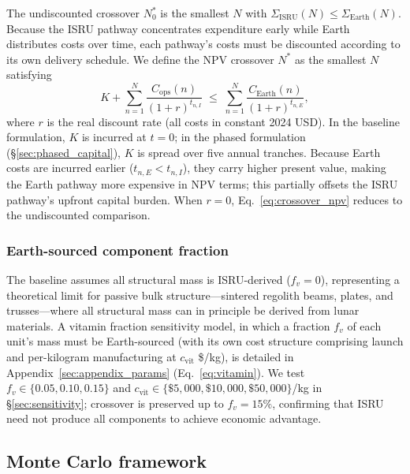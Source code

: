 \documentclass[preprint,12pt]{elsarticle}
\begin{document}
The undiscounted crossover $N^*_0$ is the smallest $N$ with $\Sigma_{\mathrm{ISRU}}(N) \leq \Sigma_{\mathrm{Earth}}(N)$. Because the ISRU pathway concentrates expenditure early while Earth distributes costs over time, each pathway's costs must be discounted according to its own delivery schedule. We define the NPV crossover $N^*$ as the smallest $N$ satisfying
\begin{equation}
  K + \sum_{n=1}^{N} \frac{C_{\mathrm{ops}}(n)}{(1+r)^{t_{n,I}}} \;\leq\; \sum_{n=1}^{N} \frac{C_{\mathrm{Earth}}(n)}{(1+r)^{t_{n,E}}},
  \label{eq:crossover_npv}
\end{equation}
where $r$ is the real discount rate (all costs in constant 2024 USD). In the baseline formulation, $K$ is incurred at $t = 0$; in the phased formulation (\S\ref{sec:phased_capital}), $K$ is spread over five annual tranches. Because Earth costs are incurred earlier ($t_{n,E} < t_{n,I}$), they carry higher present value, making the Earth pathway more expensive in NPV terms; this partially offsets the ISRU pathway's upfront capital burden. When $r = 0$, Eq.~\ref{eq:crossover_npv} reduces to the undiscounted comparison.

\subsubsection{Earth-sourced component fraction}
\label{sec:vitamin}

The baseline assumes all structural mass is ISRU-derived ($f_v = 0$), representing a theoretical limit for passive bulk structure---sintered regolith beams, plates, and trusses---where all structural mass can in principle be derived from lunar materials. A vitamin fraction sensitivity model, in which a fraction $f_v$ of each unit's mass must be Earth-sourced (with its own cost structure comprising launch and per-kilogram manufacturing at $c_{\mathrm{vit}}$ \$/kg), is detailed in Appendix~\ref{sec:appendix_params} (Eq.~\ref{eq:vitamin}). We test $f_v \in \{0.05, 0.10, 0.15\}$ and $c_{\mathrm{vit}} \in \{\$5{,}000, \$10{,}000, \$50{,}000\}$/kg in \S\ref{sec:sensitivity}; crossover is preserved up to $f_v = 15\%$, confirming that ISRU need not produce all components to achieve economic advantage.

\subsection{Monte Carlo framework}
\end{document}
